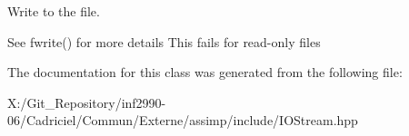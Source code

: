 Write to the file. 

See fwrite() for more details This fails for read-\/only files 

The documentation for this class was generated from the following file\-:\begin{DoxyCompactItemize}
\item 
X\-:/\-Git\-\_\-\-Repository/inf2990-\/06/\-Cadriciel/\-Commun/\-Externe/assimp/include/I\-O\-Stream.\-hpp\end{DoxyCompactItemize}
